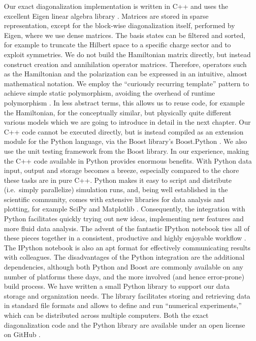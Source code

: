 Our  exact diagonalization implementation is written in C++ and uses
the excellent Eigen linear algebra library \cite{eigen}. Matrices are stored in
sparse representation, except for the block-wise diagonalization itself,
performed by Eigen, where we use dense matrices. The basis states can be
filtered and sorted, for example to truncate the Hilbert space to a specific
charge sector and to exploit symmetries. We do not build the Hamiltonian matrix
directly, but instead construct creation and annihilation operator matrices.
Therefore, operators such as the Hamiltonian and the polarization can be
expressed in an intuitive, almost mathematical notation. We employ the
``curiously recurring template'' pattern to achieve simple static polymorphism,
avoiding the overhead of runtime polymorphism \cite{andrei2001modern}. In less
abstract terms, this allows us to reuse code, for example the Hamiltonian, for
the conceptually similar, but physically quite different various 
models which we are going to introduce in detail in the next chapter. Our C++
code cannot be executed directly, but is instead compiled as an extension module
for the Python language, via the Boost library's Boost.Python \cite{boost}. We
also use the unit testing framework from the Boost library. In our experience,
making the C++ code available in Python provides enormous benefits. With Python
data input, output and storage becomes a breeze, especially compared to the
chore these tasks are in pure C++. Python makes it easy to script and distribute
(i.e.\ simply parallelize) simulation runs, and, being well established in the
scientific community, comes with extensive libraries for data analysis and
plotting, for example SciPy and Matplotlib \cite{scipy}
\cite{hunter2007matplotlib}. Consequently, the integration with Python
facilitates quickly trying out new ideas, implementing new features and more
fluid data analysis. The advent of the fantastic IPython notebook ties all of
these pieces together in a consistent, productive and highly enjoyable workflow
\cite{perez2007ipython}. The IPython notebook is also an apt format for
effectively communicating results with colleagues. The disadvantages of the
Python integration are the additional dependencies, although both Python and
Boost are commonly available on any number of platforms these days, and the more
involved (and hence error-prone) build process. We have written a small Python
library to support our data storage and organization needs. The library
facilitates storing and retrieving data in standard file formats and allows to
define and run ``numerical experiments,'' which can be distributed across
multiple computers. Both the  exact diagonalization code and the
Python library are available under an open license on GitHub \cite{githubqca}
\cite{githubcoma}.
